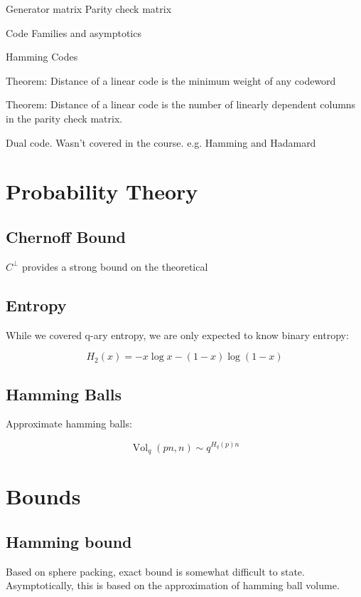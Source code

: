 \documentclass{idc_msc}
\DeclareMathOperator{\Vol}{Vol}
\begin{document}
Generator matrix
Parity check matrix

Code Families and asymptotics

Hamming Codes

Theorem: Distance of a linear code is the minimum weight of any codeword

Theorem: Distance of a linear code is the number of linearly dependent columns in the parity check matrix.

Dual code.
Wasn’t covered in the course. e.g. Hamming and Hadamard

\section{Probability Theory}

\subsection{Chernoff Bound}

\(C^{\bot}\) provides a strong bound on the theoretical 

\subsection{Entropy}

While we covered q-ary entropy, we are only expected to know binary entropy:

\[H_2(x) = -x\log x - (1-x)\log(1-x)\]


\subsection{Hamming Balls}

Approximate hamming balls:

\[\Vol_q(pn,n) \sim q^{H_q(p)n}\]

\section{Bounds}

\subsection{Hamming bound}

Based on sphere packing, exact bound is somewhat difficult to state.
Asymptotically, this is based on the approximation of hamming ball volume.
\end{document}

